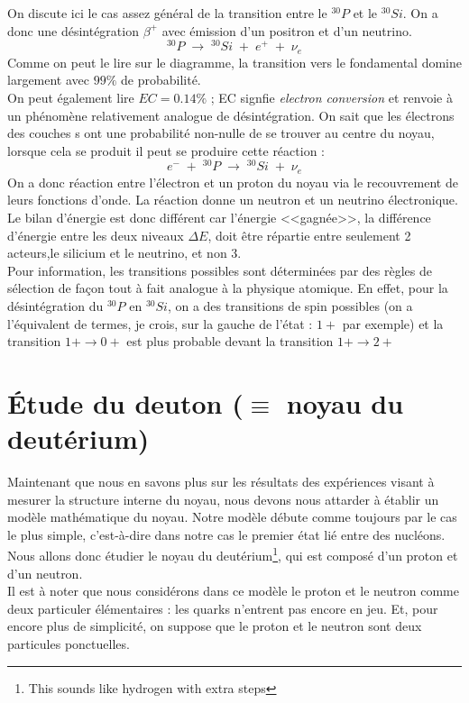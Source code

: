 On discute ici le cas assez général de la transition entre le $^{30}P$ et le $^{30}Si$. On a donc une désintégration $\beta^+$ avec émission d'un positron et d'un neutrino.
\begin{equation*}
    ^{30}P \; \longrightarrow \; ^{30}Si \; + \; e^+ \; + \; \nu_e
\end{equation*}
Comme on peut le lire sur le diagramme, la transition vers le fondamental domine largement avec $99\%$ de probabilité.\\
On peut également lire $EC = 0.14\%$ ; EC signfie \emph{electron conversion} et renvoie à un phénomène relativement analogue de désintégration. On sait que les électrons des couches s ont une probabilité non-nulle de se trouver au centre du noyau, lorsque cela se produit il peut se produire cette réaction :
\begin{equation*}
    e^- \; + \; ^{30}P \; \longrightarrow \; ^{30}Si \; + \; \nu_e
\end{equation*}
On a donc réaction entre l'électron et un proton du noyau via le recouvrement de leurs fonctions d'onde. La réaction donne un neutron et un neutrino électronique. Le bilan d'énergie est donc différent car l'énergie <<gagnée>>, la différence d'énergie entre les deux niveaux $\Delta E$, doit être répartie entre seulement 2 acteurs,le silicium et le neutrino, et non 3.\\
Pour information, les transitions possibles sont déterminées par des règles de sélection de façon tout à fait analogue à la physique atomique. En effet, pour la désintégration du $^{30}P$ en $^{30}Si$, on a des transitions de spin possibles (on a l'équivalent de termes, je crois, sur la gauche de l'état : $1+$ par exemple) et la transition $1+ \rightarrow 0+$ est plus probable devant la transition $1+ \rightarrow 2+$







\section{Étude du deuton ($\equiv$ noyau du deutérium)}

Maintenant que nous en savons plus sur les résultats des expériences visant à mesurer la structure interne du noyau, nous devons nous attarder à établir un modèle mathématique du noyau. Notre modèle débute comme toujours par le cas le plus simple, c'est-à-dire dans notre cas le premier état lié entre des nucléons. Nous allons donc étudier le noyau du deutérium\footnote{This sounds like hydrogen with extra steps}, qui est composé d'un proton et d'un neutron.\\
Il est à noter que nous considérons dans ce modèle le proton et le neutron comme deux particuler élémentaires : les quarks n'entrent pas encore en jeu. Et, pour encore plus de simplicité, on suppose que le proton et le neutron sont deux particules ponctuelles.\\


